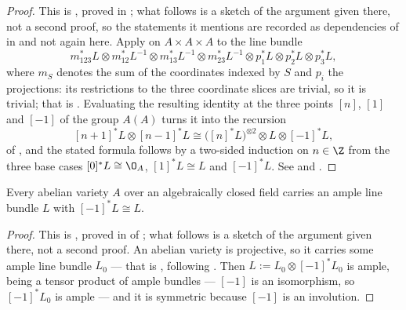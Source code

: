 \begin{proof}
This is , proved in ;
what follows is a sketch of the argument given there, not a second proof, so
the statements it mentions are recorded as dependencies of
 in  and not again here.  Apply
 on
$A\times A\times A$ to the line bundle
\[
  m_{123}^*L\otimes m_{12}^*L^{-1}\otimes m_{13}^*L^{-1}\otimes
  m_{23}^*L^{-1}\otimes p_1^*L\otimes p_2^*L\otimes p_3^*L,
\]
where $m_S$ denotes the sum of the coordinates indexed by $S$ and $p_i$ the
projections: its restrictions to the three coordinate slices are trivial, so it
is trivial; that is .  Evaluating the resulting identity
at the three points $[n]$, $[1]$ and $[-1]$ of the group $A(A)$ turns it into
the recursion
\[
  [n+1]^*L\otimes[n-1]^*L\cong\bigl([n]^*L\bigr)^{\otimes2}\otimes L\otimes
  [-1]^*L,
\]
of , and the stated formula follows by a
two-sided induction on $n\in\Z$ from the three base cases $[0]^*L\cong\O_A$,
$[1]^*L\cong L$ and $[-1]^*L$.  See \cite[\S6]{MumfordAbelianVarieties} and
\cite[I, \S5]{MilneAbelianVarieties}.
\end{proof}

\begin{proposition}
\label{prop:av-symmetric-ample}
Every abelian variety $A$ over an algebraically closed field carries an ample
line bundle $L$ with $[-1]^*L\cong L$.
\end{proposition}
\begin{proof}
This is , proved in 
of ; what follows is a sketch of the argument given there, not
a second proof.  An abelian variety is projective, so it carries some ample
line bundle $L_0$ --- that is , following
\cite[I, \S7]{MilneAbelianVarieties}.  Then $L:=L_0\otimes[-1]^*L_0$ is ample,
being a tensor product of ample bundles --- $[-1]$ is an isomorphism, so
$[-1]^*L_0$ is ample --- and it is symmetric because $[-1]$ is an involution.
\end{proof}

